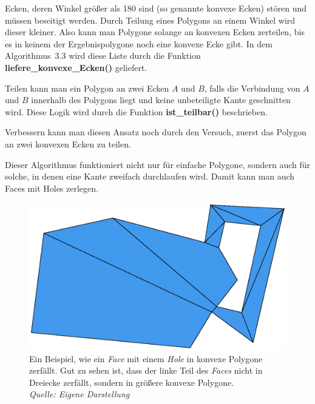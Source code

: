 Ecken, deren Winkel größer als 180\degree\/ sind (so genannte konvexe Ecken) stören und müssen beseitigt werden. Durch Teilung eines Polygons an einem Winkel wird dieser kleiner. Also kann man Polygone solange an konvexen Ecken zerteilen, bis es in keinem der Ergebnispolygone noch eine konvexe Ecke gibt. In dem Algorithmus~3.3 wird diese Liste durch die Funktion \textbf{liefere\_konvexe\_Ecken()} geliefert.

Teilen kann man ein Polygon an zwei Ecken $A$ und $B$, falls die Verbindung von $A$ und $B$ innerhalb des Polygons liegt und keine unbeteiligte Kante geschnitten wird. Diese Logik wird durch die Funktion \textbf{ist\_teilbar()} beschrieben.

Verbessern kann man diesen Ansatz noch durch den Versuch, zuerst das Polygon an zwei konvexen Ecken zu teilen.

Dieser Algorithmus funktioniert nicht nur für einfache Polygone, sondern auch für solche, in denen eine Kante zweifach durchlaufen wird. Damit kann man auch Faces mit Holes zerlegen.

\begin{figure}
	\centering
	\includegraphics[scale=.9]{Convexer2.svg.eps}
	\caption[Face mit einem Hole das in konvexe Polygone zerfällt]{Ein Beispiel, wie ein \textit{Face} mit einem \textit{Hole} in konvexe Polygone zerfällt. Gut zu sehen ist, dass der linke Teil des \textit{Faces} nicht in Dreiecke zerfällt, sondern in größere konvexe Polygone.\\\textit{Quelle: Eigene Darstellung}}
	\label{fig:ZerlegungFace}
\end{figure}


